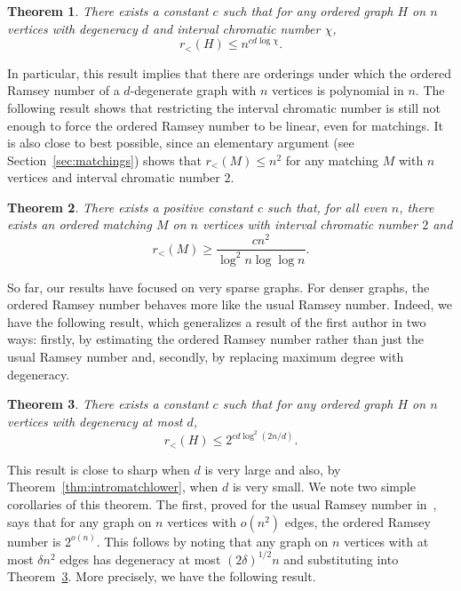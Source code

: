 \documentclass[11pt]{article}
\newtheorem{theorem}{Theorem}[section]
\newcommand{\rord}{r_{<}}
\begin{document}
\begin{theorem} \label{thm:introBEwithChi}
There exists a constant $c$ such that for any ordered graph $H$ on $n$ vertices with degeneracy $d$ and interval chromatic number $\chi$, 
\[\rord(H) \leq n^{c d \log \chi}.\]
\end{theorem}

In particular, this result implies that there are orderings under which the ordered Ramsey number of a $d$-degenerate graph with $n$ vertices is polynomial in $n$.
The following result shows that restricting the interval chromatic number is still not enough to force the ordered Ramsey number to be linear, even for matchings. It is also close to best possible, since an elementary argument (see Section~\ref{sec:matchings}) shows that $r_<(M) \leq n^2$ for any matching $M$ with $n$ vertices and interval chromatic number $2$.

\begin{theorem} \label{thm:introlowerwithChi}
There exists a positive constant $c$ such that, for all even $n$, there exists an ordered matching $M$ on $n$ vertices with interval chromatic number $2$ and
\[\rord(M) \geq \frac{c n^2}{\log^2 n \log \log n}.\]
\end{theorem}

So far, our results have focused on very sparse graphs. For denser graphs, the ordered Ramsey number behaves more like the usual Ramsey number. Indeed, we have the following result, which generalizes a result of the first author \cite{C13} in two ways: firstly, by estimating the ordered Ramsey number rather than just the usual Ramsey number and, secondly, by replacing maximum degree with degeneracy.

\begin{theorem} \label{thm:introdense}
There exists a constant $c$ such that for any ordered graph $H$ on $n$ vertices with degeneracy at most $d$,
\[\rord(H) \leq 2^{c d \log^2(2n/d)}.\]
\end{theorem}

This result is close to sharp when $d$ is very large and also, by Theorem~\ref{thm:intromatchlower}, when $d$ is very small. We note two simple corollaries of this theorem. The first, proved for the usual Ramsey number in~\cite{C13}, says that for any graph on $n$ vertices with $o(n^2)$ edges, the ordered Ramsey number is $2^{o(n)}$. This follows by noting that any graph on $n$ vertices with at most $\delta n^2$ edges has degeneracy at most $(2 \delta)^{1/2} n$ and substituting into Theorem~\ref{thm:introdense}. More precisely, we have the following result.
\end{document}
